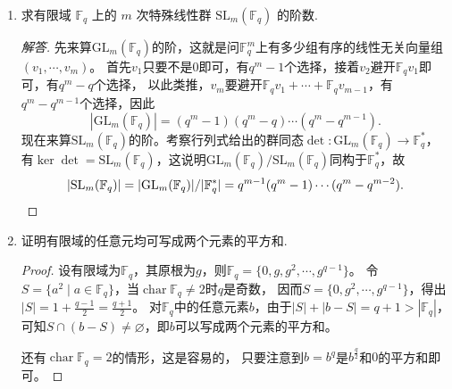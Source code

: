 \begin{enumerate}
\item 求有限域 $\mathbb{F}_q$ 上的 $m$ 次特殊线性群 $\mathrm{SL}_m(\mathbb{F}_q)$ 的阶数.
\begin{proof}[解答]
    先来算$\mathrm{GL}_m(\mathbb{F}_q)$的阶，这就是问$\mathbb{F}_q^m$上有多少组有序的线性无关向量组$(v_1,\cdots,v_m)$。
    首先$v_1$只要不是$0$即可，有$q^m-1$个选择，接着$v_2$避开$\mathbb{F}_qv_1$即可，有$q^m-q$个选择，
    以此类推，$v_m$要避开$\mathbb{F}_qv_1+\cdots+\mathbb{F}_qv_{m-1}$，有$q^m-q^{m-1}$个选择，因此
    \[|\mathrm{GL}_m(\mathbb{F}_q)|=(q^m-1)(q^m-q)\cdots(q^m-q^{m-1}).\]
    现在来算$\mathrm{SL}_m(\mathbb{F}_q)$的阶。考察行列式给出的群同态$\det:\mathrm{GL}_m(\mathbb{F}_q)\to\mathbb{F}_q^*$，
    有$\ker\det=\mathrm{SL}_m(\mathbb{F}_q)$，这说明$\mathrm{GL}_m(\mathbb{F}_q)/\mathrm{SL}_m(\mathbb{F}_q)$同构于$\mathbb{F}_q^*$，故
    \[|\mathrm{SL}_m(\mathbb{F}_q)|=|\mathrm{GL}_m(\mathbb{F}_q)|/|\mathbb{F}_q^*|=q^{m-1}(q^m-1)\cdots(q^m-q^{m-2}).\qedhere\]
\end{proof}

\item 证明有限域的任意元均可写成两个元素的平方和.
\begin{proof}
    设有限域为$\mathbb{F}_q$，其原根为$g$，则$\mathbb{F}_q=\{0,g,g^2,\cdots,g^{q-1}\}$。
    令$S=\{a^2 \mid a\in\mathbb{F}_q\}$，当$\operatorname{char}\mathbb{F}_q\ne2$时$q$是奇数，
    因而$S=\{0,g^2,\cdots,g^{q-1}\}$，得出$|S|=1+\frac{q-1}{2}=\frac{q+1}{2}$。
    对$\mathbb{F}_q$中的任意元素$b$，由于$|S|+|b-S|=q+1>|\mathbb{F}_q|$，
    可知$S\cap(b-S)\ne\varnothing$，即$b$可以写成两个元素的平方和。

    还有$\operatorname{char}\mathbb{F}_q=2$的情形，这是容易的，
    只要注意到$b=b^q$是$b^{\frac{q}{2}}$和$0$的平方和即可。
\end{proof}


\end{enumerate}
